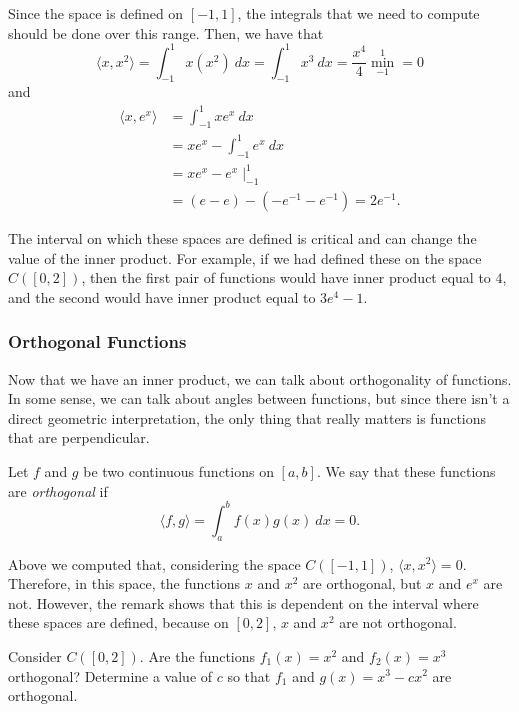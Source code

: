 \begin{exampleSol}
Since the space is defined on $[-1,1]$, the integrals that we need to compute should be done over this range. Then, we have that
\[
\langle x, x^2 \rangle = \int_{-1}^1 x(x^2)\ dx = \int_{-1}^1 x^3\ dx = \frac{x^4}{4}\min_{-1}^1 = 0 
\]
and
\[ 
\begin{split}
\langle x, e^x \rangle &= \int_{-1}^1 xe^x\ dx \\
&= xe^x - \int_{-1}^1 e^x\ dx \\
&= xe^x - e^x \mid_{-1}^1 \\
&= (e - e) - (-e^{-1} - e^{-1}) = 2e^{-1} .
\end{split}
\]
\end{exampleSol}

\begin{remark}
The interval on which these spaces are defined is critical and can change the value of the inner product. For example, if we had defined these on the space $C([0,2])$, then the first pair of functions would have inner product equal to $4$, and the second would have inner product equal to $3e^4 - 1$.
\end{remark}

\subsubsection{Orthogonal Functions}

Now that we have an inner product, we can talk about orthogonality of functions. In some sense, we can talk about angles between functions, but since there isn't a direct geometric interpretation, the only thing that really matters is functions that are perpendicular. 

\begin{definition}
Let $f$ and $g$ be two continuous functions on $[a,b]$. We say that these functions are \emph{orthogonal} if 
\[ \langle f, g \rangle = \int_a^b f(x)g(x)\ dx = 0. \]
\end{definition}

Above we computed that, considering the space $C([-1,1])$, $\langle x, x^2 \rangle = 0$. Therefore, in this space, the functions $x$ and $x^2$ are orthogonal, but $x$ and $e^x$ are not. However, the remark shows that this is dependent on the interval where these spaces are defined, because on $[0,2]$, $x$ and $x^2$ are not orthogonal.

\begin{example}
Consider $C([0,2])$. Are the functions $f_1(x) = x^2$ and $f_2(x) = x^3$ orthogonal? Determine a value of $c$ so that $f_1$ and $g(x) = x^3 - cx^2$ are orthogonal.
\end{example}

